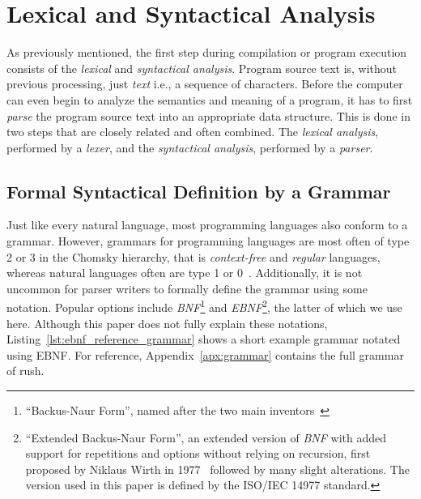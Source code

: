 \section{Lexical and Syntactical Analysis}

As previously mentioned, the first step during compilation or program execution consists of the \emph{lexical} and \emph{syntactical analysis}.
Program source text is, without previous processing, just \emph{text} i.e., a sequence of characters.
Before the computer can even begin to analyze the semantics and meaning of a program, it has to first \emph{parse} the program source text into an appropriate data structure.
This is done in two steps that are closely related and often combined.
The \emph{lexical analysis}, performed by a \emph{lexer}, and the \emph{syntactical analysis}, performed by a \emph{parser}.

\subsection{Formal Syntactical Definition by a Grammar}

Just like every natural language, most programming languages also conform to a grammar.
However, grammars for programming languages are most often of type 2 or 3 in the Chomsky hierarchy, that is \emph{context-free} and \emph{regular} languages, whereas natural languages often are type 1 or 0~\cite[p.~24]{Watson2017}.
Additionally, it is not uncommon for parser writers to formally define the grammar using some notation.
Popular options include \emph{BNF}\footnote{\enquote{Backus-Naur Form}, named after the two main inventors~\cite{Backus1960}} and \emph{EBNF}\footnote{\enquote{Extended Backus-Naur Form}, an extended version of \emph{BNF} with added support for repetitions and options without relying on recursion, first proposed by Niklaus Wirth in 1977~\cite{Wirth1977} followed by many slight alterations. The version used in this paper is defined by the ISO/IEC 14977 standard.}, the latter of which we use here.
Although this paper does not fully explain these notations, Listing~\ref{lst:ebnf_reference_grammar} shows a short example grammar notated using EBNF.
For reference, Appendix~\ref{apx:grammar} contains the full grammar of rush.


